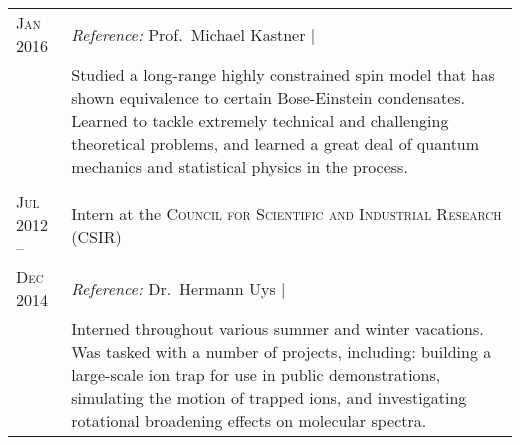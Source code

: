 \begin{supertabular}{l|p{11cm}}
	\textsc{Jan 2016} 			& \emph{Reference:} Prof.\ Michael Kastner | \\
	 							& \footnotesize{Studied a long-range highly constrained spin model that has shown equivalence to certain Bose-Einstein condensates. Learned to tackle extremely technical and challenging theoretical problems, and learned a great deal of quantum mechanics and statistical physics in the process.}\\
	 \\
	\textsc{Jul 2012 --} 		& Intern at the \textsc{Council for Scientific and Industrial Research (CSIR)} \\
	\textsc{Dec 2014}			& \emph{Reference:} Dr.\ Hermann Uys | \\
	 							& \footnotesize{Interned throughout various summer and winter vacations. Was tasked with a number of projects, including: building a large-scale ion trap for use in public demonstrations, simulating the motion of trapped ions, and investigating rotational broadening effects on molecular spectra.} \\
\end{supertabular}